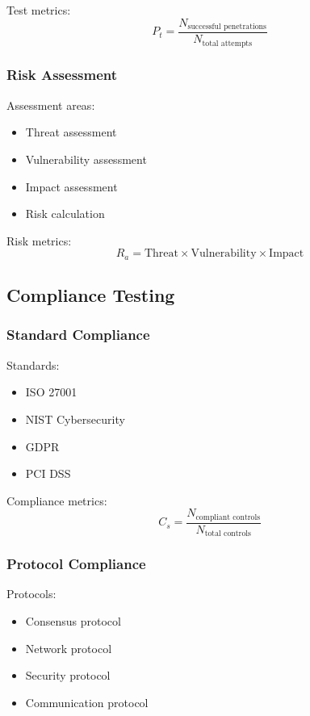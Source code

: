 \documentclass[12pt]{article}
\begin{document}
Test metrics:
\begin{equation}
P_t = \frac{N_{\text{successful penetrations}}}{N_{\text{total attempts}}}
\end{equation}

\subsubsection{Risk Assessment}

Assessment areas:
\begin{itemize}
\item Threat assessment
\item Vulnerability assessment
\item Impact assessment
\item Risk calculation
\end{itemize}

Risk metrics:
\begin{equation}
R_a = \text{Threat} \times \text{Vulnerability} \times \text{Impact}
\end{equation}

\subsection{Compliance Testing}

\subsubsection{Standard Compliance}

Standards:
\begin{itemize}
\item ISO 27001
\item NIST Cybersecurity
\item GDPR
\item PCI DSS
\end{itemize}

Compliance metrics:
\begin{equation}
C_s = \frac{N_{\text{compliant controls}}}{N_{\text{total controls}}}
\end{equation}

\subsubsection{Protocol Compliance}

Protocols:
\begin{itemize}
\item Consensus protocol
\item Network protocol
\item Security protocol
\item Communication protocol
\end{itemize}
\end{document}

